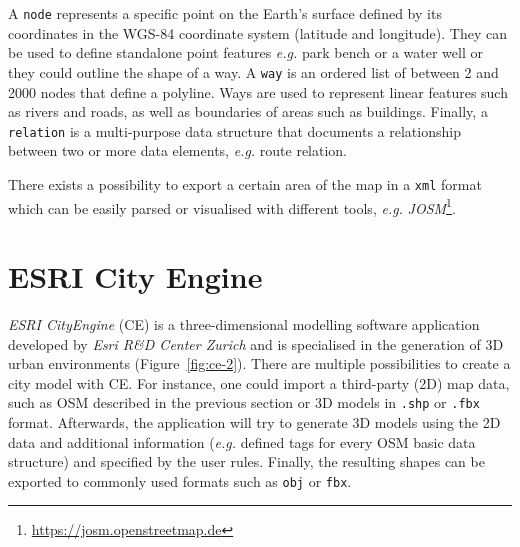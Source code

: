 A \texttt{node} represents a specific point on the Earth's surface defined by its coordinates in the WGS-84 coordinate system (latitude and longitude). They can be used to define standalone point features \emph{e.g.} park bench or a water well or they could outline the shape of a way. A \texttt{way} is an ordered list of between 2 and \num{2 000} nodes that define a polyline. Ways are used to represent linear features such as rivers and roads, as well as boundaries of areas such as buildings. Finally, a \texttt{relation} is a multi-purpose data structure that documents a relationship between two or more data elements, \emph{e.g.} route relation.

There exists a possibility to export a certain area of the map in a \texttt{xml} format which can be easily parsed or visualised with different tools, \emph{e.g.} \emph{JOSM}\footnote{\url{https://josm.openstreetmap.de}}.

\section{ESRI City Engine}
\label{ch:ce}
\emph{ESRI CityEngine} (CE) is a three-dimensional modelling software application developed by \emph{Esri R\&D Center Zurich} and is specialised in the generation of 3D urban environments (Figure~\ref{fig:ce-2}). There are multiple possibilities to create a city model with CE. For instance, one could import a third-party (2D) map data, such as OSM described in the previous section or 3D models in \texttt{.shp} or \texttt{.fbx} format. Afterwards, the application will try to generate 3D models using the 2D data and additional information (\emph{e.g.} defined tags for every OSM basic data structure) and specified by the user rules. Finally, the resulting shapes can be exported to commonly used formats such as \texttt{obj} or \texttt{fbx}.

